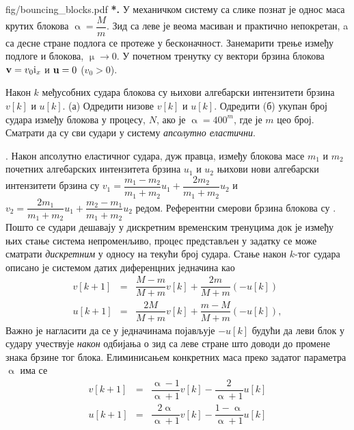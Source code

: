 \newpage
\begin{slikaDesno}{fig/bouncing_blocks.pdf}
\textbf{{\color{red}*}\ID.}
    У механичком систему са слике познат
је однос 
маса крутих блокова $
\upalpha = \dfrac{M}{m}$. 
Зид са леве је веома масиван и 
практично непокретан, a са десне стране подлога 
се протеже у бесконачност.
Занемарити трење између подлоге 
и блокова, 
$\upmu \to 0$. 
У почетном тренутку су вектори брзина 
блокова
${\bf v} = v_0 {\rm i}_x$ и
${\bf u} = 0$ ($v_0 > 0$). 
\end{slikaDesno}
Након $k$ међусобних судара блокова су 
њихови алгебарски интензитети брзина 
$v[k]$ и $u[k]$.
(а) Одредити низове $v[k]$ и $u[k]$.
Одредити (б) укупан
број судара између блокова у процесу, $N$, 
ако је $\upalpha = 400^m$, где је $m$ цео број.
Сматрати да су сви судари у систему 
\textit{апсолутно еластични}. 

\textit{}. Након 
апсолутно еластичног
судара, дуж правца, између блокова масе $m_1$ и $m_2$ 
почетних алгебарских интензитета брзина $u_1$ и 
$u_2$ њихови нови алгебарски интензитети брзина су 
$v_1 = \dfrac{m_1-m_2}{m_1+m_2} u_1 + 
\dfrac{2m_2}{m_1+m_2} u_2$  и 
$v_2 = 
\dfrac{2 m_1}{m_1+m_2} u_1
+
\dfrac{m_2 - m_1}{m_1 + m_2} u_2  
$ редом. Референтни смерови брзина блокова 
су . \\

\RESENJE  Пошто се судари дешавају у дискретним временским тренуцима 
док је између њих стање система непроменљиво, процес представљен у задатку се може сматрати
\textit{дискретним} у односу на текући број судара. Стање након $k$-тог судара описано је
системом датих диференцних једначина као 
\begin{eqnarray}
    v[k+1] & = & \dfrac{M - m}{M + m} v[k] + \dfrac{2m}{M + m} (-u[k]) \\[2mm]
    u[k+1] & = & \dfrac{2M}{M + m} v[k] + \dfrac{m - M}{M + m} (-u[k]),
\end{eqnarray} 
Важно је нагласити да се у једначинама појављује $-u[k]$ будући да леви блок у судару учествује 
\textit{након} одбијања о зид са леве стране што доводи до промене знака брзине тог блока. 
Елиминисањем конкретних маса преко задатог параметра $\upalpha$ има се
\begin{eqnarray}
    v[k+1] & = & \dfrac{\upalpha - 1}{\upalpha + 1} v[k] - \dfrac{2}{\upalpha + 1} u[k] \\[2mm]
    u[k+1] & = & \dfrac{2\upalpha}{\upalpha + 1} v[k] - \dfrac{1 - \upalpha}{\upalpha + 1} u[k]
\end{eqnarray} 

